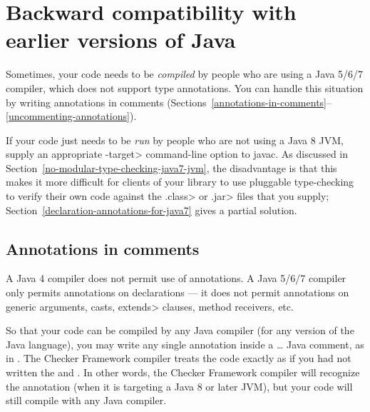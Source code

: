 \section{Backward compatibility with earlier versions of Java\label{backward-compatibility}}

Sometimes, your code needs to be \emph{compiled} by people who are using a
Java 5/6/7 compiler, which does not support type annotations.
You can handle this situation by writing annotations in comments (Sections~\ref{annotations-in-comments}--\ref{uncommenting-annotations}).

If your code just needs to be \emph{run} by people who are not using a Java
8 JVM, supply an appropriate \<-target> command-line option to javac.  As
discussed in Section~\ref{no-modular-type-checking-java7-jvm}, the
disadvantage is that this makes it more difficult for clients of your
library to use pluggable type-checking to verify their own code against the
\<.class> or \<.jar> files that you supply;
Section~\ref{declaration-annotations-for-java7} gives a partial solution.


\subsection{Annotations in comments\label{annotations-in-comments}}

A Java 4 compiler does not permit use of
annotations.
A Java 5/6/7 compiler only permits annotations on
declarations --- it does not permit annotations on generic arguments,
casts, \<extends> clauses, method receivers, etc.

So that your code can be compiled by any Java compiler (for any version of
the Java language), you may write any single annotation inside a
\code{/*}\ldots\code{*/} Java comment, as in .
The Checker Framework compiler treats the code exactly as if you had not written the
\code{/*} and \code{*/}.
In other words, the Checker Framework compiler will recognize the
annotation (when it is targeting a Java 8 or later JVM),
but your code will still compile with any Java compiler.


